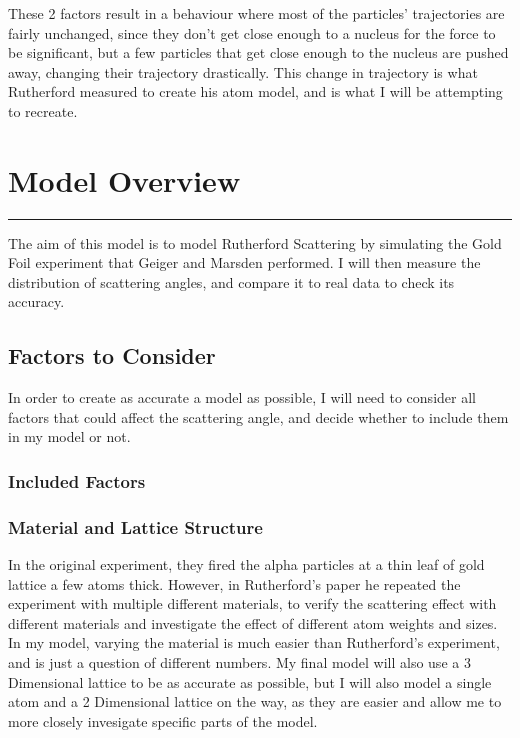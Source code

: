 \documentclass[11pt]{article}
\begin{document}
These 2 factors result in a behaviour where most of the particles'
trajectories are fairly unchanged, since they don't get close enough to
a nucleus for the force to be significant, but a few particles that get
close enough to the nucleus are pushed away, changing their trajectory
drastically. This change in trajectory is what Rutherford measured to
create his atom model, and is what I will be attempting to recreate.

\pagebreak
    \hypertarget{model-overview}{%
\section{Model Overview}\label{model-overview}}

\begin{center}\rule{0.5\linewidth}{0.5pt}\end{center}

The aim of this model is to model Rutherford Scattering by simulating
the Gold Foil experiment that Geiger and Marsden performed. I will then
measure the distribution of scattering angles, and compare it to real
data to check its accuracy.

\hypertarget{factors-to-consider}{%
\subsection{Factors to Consider}\label{factors-to-consider}}

In order to create as accurate a model as possible, I will need to
consider all factors that could affect the scattering angle, and decide
whether to include them in my model or not.

\hypertarget{included-factors}{%
\subsubsection{Included Factors}\label{included-factors}}

\hypertarget{material-and-lattice-structure}{%
\subsubsection*{Material and Lattice
Structure}\label{material-and-lattice-structure}}
%
In the original experiment, they fired the alpha particles at a thin
leaf of gold lattice a few atoms thick. However, in Rutherford's paper
he repeated the experiment with multiple different materials, to verify
the scattering effect with different materials and investigate the
effect of different atom weights and sizes. In my model, varying the
material is much easier than Rutherford's experiment, and is just a
question of different numbers. My final model will also use a 3
Dimensional lattice to be as accurate as possible, but I will also model
a single atom and a 2 Dimensional lattice on the way, as they are easier
and allow me to more closely invesigate specific parts of the model.
\end{document}

